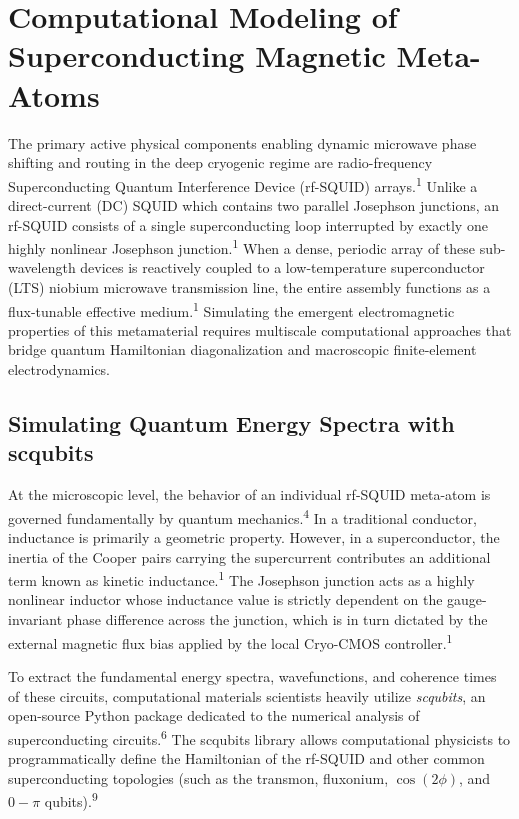 \documentclass[11pt, a4paper]{article}
\begin{document}
\section{Computational Modeling of Superconducting Magnetic Meta-Atoms}

The primary active physical components enabling dynamic microwave phase shifting and routing in the deep cryogenic regime are radio-frequency Superconducting Quantum Interference Device (rf-SQUID) arrays.\textsuperscript{1} Unlike a direct-current (DC) SQUID which contains two parallel Josephson junctions, an rf-SQUID consists of a single superconducting loop interrupted by exactly one highly nonlinear Josephson junction.\textsuperscript{1} When a dense, periodic array of these sub-wavelength devices is reactively coupled to a low-temperature superconductor (LTS) niobium microwave transmission line, the entire assembly functions as a flux-tunable effective medium.\textsuperscript{1} Simulating the emergent electromagnetic properties of this metamaterial requires multiscale computational approaches that bridge quantum Hamiltonian diagonalization and macroscopic finite-element electrodynamics.

\subsection{Simulating Quantum Energy Spectra with scqubits}

At the microscopic level, the behavior of an individual rf-SQUID meta-atom is governed fundamentally by quantum mechanics.\textsuperscript{4} In a traditional conductor, inductance is primarily a geometric property. However, in a superconductor, the inertia of the Cooper pairs carrying the supercurrent contributes an additional term known as kinetic inductance.\textsuperscript{1} The Josephson junction acts as a highly nonlinear inductor whose inductance value is strictly dependent on the gauge-invariant phase difference across the junction, which is in turn dictated by the external magnetic flux bias applied by the local Cryo-CMOS controller.\textsuperscript{1}

To extract the fundamental energy spectra, wavefunctions, and coherence times of these circuits, computational materials scientists heavily utilize \textit{scqubits}, an open-source Python package dedicated to the numerical analysis of superconducting circuits.\textsuperscript{6} The scqubits library allows computational physicists to programmatically define the Hamiltonian of the rf-SQUID and other common superconducting topologies (such as the transmon, fluxonium, $\cos(2\phi)$, and $0-\pi$ qubits).\textsuperscript{9}
\end{document}
